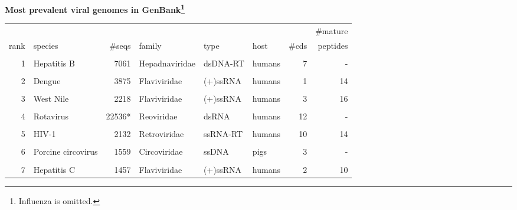 \documentclass[landscape]{slides}
\begin{document}
\begin{slide}
\begin{center}

\textbf{Most prevalent viral genomes in GenBank\footnote{Influenza is omitted.}}

\tiny
\begin{tabular}{r|l|r|l|l|l|r|r}
       &                    &              &                &          &        &       & \#mature \\ 
  rank & species            &       \#seqs & family         & type     & host   & \#cds & peptides \\ \hline
       &                    &              &                &          &        &       &          \\ 
     1 & Hepatitis B        &         7061 & Hepadnaviridae & dsDNA-RT & humans &     7 &       -  \\
       &                    &              &                &          &        &       &          \\ 
     2 & Dengue             &         3875 & Flaviviridae   & (+)ssRNA & humans &     1 &      14  \\
       &                    &              &                &          &        &       &          \\ 
     3 & West Nile          &        2218  & Flaviviridae   & (+)ssRNA & humans &     3 &      16  \\
       &                    &              &                &          &        &       &          \\ 
     4 & Rotavirus          &      22536*  & Reoviridae     & dsRNA    & humans &    12 &       -  \\
       &                    &              &                &          &        &       &          \\ 
     5 & HIV-1              &        2132  & Retroviridae   & ssRNA-RT & humans &    10 &      14  \\
       &                    &              &                &          &        &       &          \\ 
     6 & Porcine circovirus &        1559  & Circoviridae   & ssDNA    & pigs   &     3 &       -  \\
       &                    &              &                &          &        &       &          \\ 
     7 & Hepatitis C        &        1457  & Flaviviridae   & (+)ssRNA & humans &     2 &      10  \\

\end{tabular}
\end{center}
\end{slide}
\end{document}
